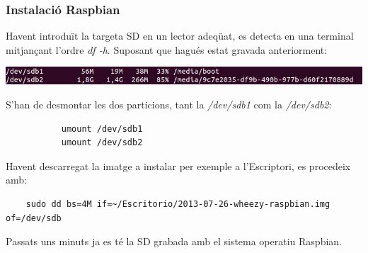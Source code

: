 \documentclass[twoside]{article}
\begin{document}
\subsubsection*{Instalació Raspbian}
Havent introduït la targeta SD en un lector adeqüat, es detecta en una terminal mitjançant l'ordre \textit{df -h}. Suposant que hagués estat gravada anteriorment:
\begin{center}
\includegraphics[scale=0.7]{images/InstalRasp1.jpeg}
\end{center}
S'han de desmontar les dos particions, tant la \textit{/dev/sdb1} com la \textit{/dev/sdb2}:
\begin{verbatim}
           umount /dev/sdb1
           umount /dev/sdb2
\end{verbatim}
Havent descarregat la imatge a instalar per exemple a l'Escriptori, es procedeix amb:
\begin{verbatim}
    sudo dd bs=4M if=~/Escritorio/2013-07-26-wheezy-raspbian.img of=/dev/sdb
\end{verbatim}
Passats uns minuts ja es té la SD grabada amb el sistema operatiu Raspbian.
\end{document}
